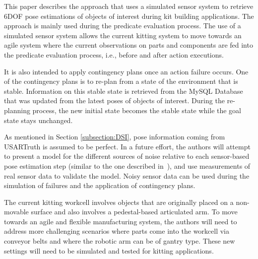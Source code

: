 This paper describes the approach that uses a simulated sensor system to retrieve 6DOF pose estimations of objects of interest during kit building applications. The approach is mainly used during the predicate evaluation process. The use of a simulated sensor system allows the current kitting system to move towards an agile system where the current observations on parts and components are fed into the predicate evaluation process, i.e., before and after action executions.

It is also intended to apply contingency plans once an action failure occurs. One of the contingency plans is to re-plan from a state of the environment that is stable. Information on this stable state is retrieved from the \textsf{MySQL Database} that was updated from the latest poses of objects of interest. During the re-planning process, the new initial state becomes the stable state while the goal state stays unchanged.

As mentioned in Section \ref{subsection:DSI}, pose information coming from USARTruth is assumed to be perfect. In a future effort, the authors will attempt to present a model for the different sources of noise relative to each sensor-based pose estimation step (similar to the one described in~\cite{Meeden.GPC.1998}), and use measurements of real sensor data to validate the model. Noisy sensor data can be used during the simulation of failures and the application of contingency plans.


The current kitting workcell involves objects that are originally placed on a non-movable surface and also involves a pedestal-based articulated arm. To move towards an agile and flexible manufacturing system, the authors will need to address more challenging scenarios where parts come into the workcell via conveyor belts and where the robotic arm can be of gantry type. These new settings will need to be simulated and tested for kitting applications.




